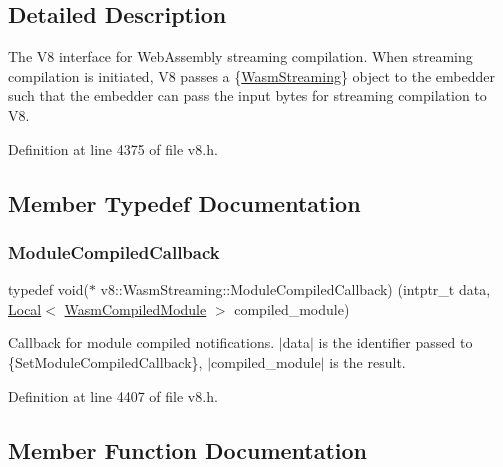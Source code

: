 \subsection{Detailed Description}
The V8 interface for Web\+Assembly streaming compilation. When streaming compilation is initiated, V8 passes a \{\mbox{\hyperlink{classv8_1_1WasmStreaming}{Wasm\+Streaming}}\} object to the embedder such that the embedder can pass the input bytes for streaming compilation to V8. 

Definition at line 4375 of file v8.\+h.



\subsection{Member Typedef Documentation}
\mbox{\label{classv8_1_1WasmStreaming_a2e8af849348cbd9fe9c3940ab010917d}} 
\subsubsection{\texorpdfstring{Module\+Compiled\+Callback}{ModuleCompiledCallback}}
{\footnotesize\ttfamily typedef void($\ast$ v8\+::\+Wasm\+Streaming\+::\+Module\+Compiled\+Callback) (intptr\+\_\+t data, \mbox{\hyperlink{classv8_1_1Local}{Local}}$<$ \mbox{\hyperlink{classv8_1_1WasmCompiledModule}{Wasm\+Compiled\+Module}} $>$ compiled\+\_\+module)}

Callback for module compiled notifications. $\vert$data$\vert$ is the identifier passed to \{Set\+Module\+Compiled\+Callback\}, $\vert$compiled\+\_\+module$\vert$ is the result. 

Definition at line 4407 of file v8.\+h.



\subsection{Member Function Documentation}
\mbox{\label{classv8_1_1WasmStreaming_aca7399d97368360079e3030b2fb4fc94}} 
